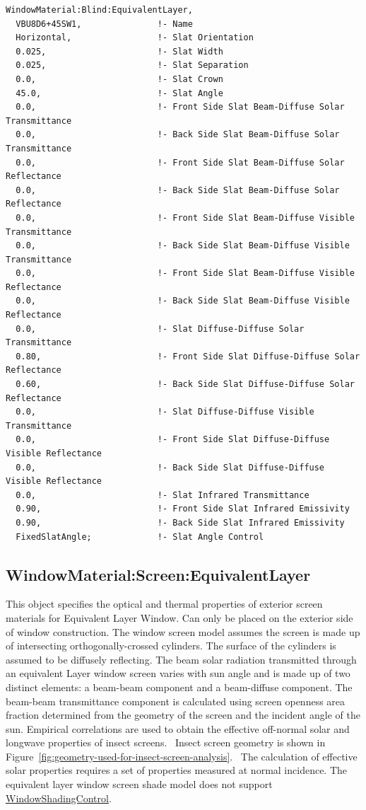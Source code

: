 \begin{lstlisting}
WindowMaterial:Blind:EquivalentLayer,
  VBU8D6+45SW1,               !- Name
  Horizontal,                 !- Slat Orientation
  0.025,                      !- Slat Width
  0.025,                      !- Slat Separation
  0.0,                        !- Slat Crown
  45.0,                       !- Slat Angle
  0.0,                        !- Front Side Slat Beam-Diffuse Solar Transmittance
  0.0,                        !- Back Side Slat Beam-Diffuse Solar Transmittance
  0.0,                        !- Front Side Slat Beam-Diffuse Solar Reflectance
  0.0,                        !- Back Side Slat Beam-Diffuse Solar Reflectance
  0.0,                        !- Front Side Slat Beam-Diffuse Visible Transmittance
  0.0,                        !- Back Side Slat Beam-Diffuse Visible Transmittance
  0.0,                        !- Front Side Slat Beam-Diffuse Visible Reflectance
  0.0,                        !- Back Side Slat Beam-Diffuse Visible  Reflectance
  0.0,                        !- Slat Diffuse-Diffuse Solar Transmittance
  0.80,                       !- Front Side Slat Diffuse-Diffuse Solar Reflectance
  0.60,                       !- Back Side Slat Diffuse-Diffuse Solar Reflectance
  0.0,                        !- Slat Diffuse-Diffuse Visible Transmittance
  0.0,                        !- Front Side Slat Diffuse-Diffuse Visible Reflectance
  0.0,                        !- Back Side Slat Diffuse-Diffuse Visible Reflectance
  0.0,                        !- Slat Infrared Transmittance
  0.90,                       !- Front Side Slat Infrared Emissivity
  0.90,                       !- Back Side Slat Infrared Emissivity
  FixedSlatAngle;             !- Slat Angle Control
\end{lstlisting}

\subsection{WindowMaterial:Screen:EquivalentLayer}\label{windowmaterialscreenequivalentlayer}

This object specifies the optical and thermal properties of exterior screen materials for Equivalent Layer Window. Can only be placed on the exterior side of window construction. The window screen model assumes the screen is made up of intersecting orthogonally-crossed cylinders. The surface of the cylinders is assumed to be diffusely reflecting. The beam solar radiation transmitted through an equivalent Layer window screen varies with sun angle and is made up of two distinct elements: a beam-beam component and a beam-diffuse component. The beam-beam transmittance component is calculated using screen openness area fraction determined from the geometry of the screen and the incident angle of the sun. Empirical correlations are used to obtain the effective off-normal solar and longwave properties of insect screens.~ Insect screen geometry is shown in Figure~\ref{fig:geometry-used-for-insect-screen-analysis}.~ The calculation of effective solar properties requires a set of properties measured at normal incidence. The equivalent layer window screen shade model does not support \hyperref[windowpropertyshadingcontrol]{WindowShadingControl}.

